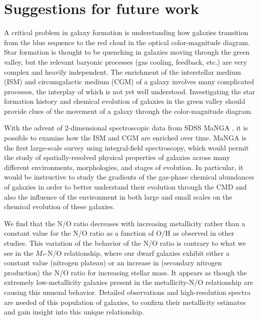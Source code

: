 \section[Future work]{Suggestions for future work}



A critical problem in galaxy formation is understanding how galaxies transition 
from the blue sequence to the red cloud in the optical color-magnitude diagram.  
Star formation is thought to be quenching in galaxies moving through the green 
valley, but the relevant baryonic processes (gas cooling, feedback, etc.) are 
very complex and heavily independent.  The enrichment of the interstellar medium 
(ISM) and circumgalactic medium (CGM) of a galaxy involves many complicated 
processes, the interplay of which is not yet well understood.  Investigating the 
star formation history and chemical evolution of galaxies in the green valley 
should provide clues of the movement of a galaxy through the color-magnitude 
diagram.

With the advent of 2-dimensional spectroscopic data from SDSS MaNGA \citep{MaNGA,
SDSS13}, it is possible to examine how the ISM and CGM are enriched over time.  
MaNGA is the first large-scale survey using integral-field spectroscopy, which 
would permit the study of spatially-resolved physical properties of galaxies 
across many different environments, morphologies, and stages of evolution.  In 
particular, it would be instructive to study the gradients of the gas-phase 
chemical abundances of galaxies in order to better understand their evolution 
through the CMD and also the influence of the environment in both large and 
small scales on the chemical evolution of these galaxies.

We find that the N/O ratio decreases with increasing metallicity rather than a 
constant value for the N/O ratio as a function of O/H as observed in other 
studies.  This variation of the behavior of the N/O ratio is contrary to what we 
see in the $M_*$-N/O relationship, where our dwarf galaxies exhibit either a 
constant value (nitrogen plateau) or an increase in (secondary nitrogen 
production) the N/O ratio for increasing stellar mass.  It appears as though the 
extremely low-metallicity galaxies present in the metallicity-N/O relationship 
are causing this unusual behavior.  Detailed observations and high-resolution 
spectra are needed of this population of galaxies, to confirm their metallicity 
estimates and gain insight into this unique relationship.

